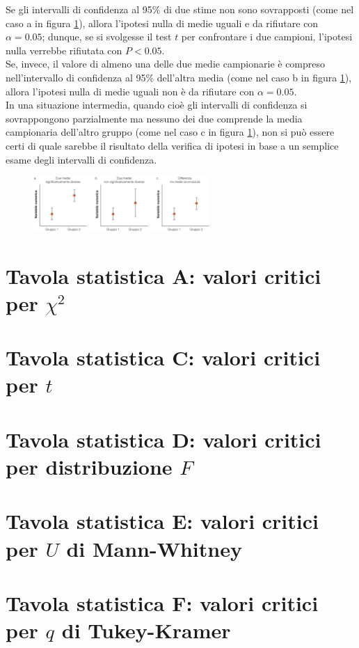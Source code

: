 \documentclass[10pt, draft]{book}
\begin{document}
Se gli intervalli di confidenza al 95\% di due stime non sono sovrapposti (come nel caso a in figura \ref{fig12.6-1}), allora l'ipotesi nulla di medie uguali e da rifiutare con $\alpha = 0.05$; dunque, se si svolgesse il test $t$ per confrontare i due campioni, l'ipotesi nulla verrebbe rifiutata con $P < 0.05$.
\\
Se, invece, il valore di almeno una delle due medie campionarie è compreso nell'intervallo di confidenza al 95\% dell'altra media (come nel caso b in figura \ref{fig12.6-1}), allora l'ipotesi nulla di medie uguali non è da rifiutare con $\alpha = 0.05$.
\\
In una situazione intermedia, quando cioè gli intervalli di confidenza si sovrappongono parzialmente ma nessuno dei due comprende la media campionaria dell'altro gruppo (come nel caso c in figura \ref{fig12.6-1}), non si può essere certi di quale sarebbe il risultato della verifica di ipotesi in base a un semplice esame degli intervalli di confidenza.
\begin{figure}[H]\label{fig12.6-1}
    \centering
    \includegraphics[width=0.6\textwidth]{fig12.6-1}
    \caption{\small{}}
\end{figure}


\section{Tavola statistica A: valori critici per \texorpdfstring{$\chi^2$}{Lg}} \label{tavA}

\section{Tavola statistica C: valori critici per \texorpdfstring{$t$}{Lg}} \label{tavC}

\section{Tavola statistica D: valori critici per distribuzione \texorpdfstring{$F$}{Lg}} \label{tavD}

\section{Tavola statistica E: valori critici per \texorpdfstring{$U$}{Lg} di Mann-Whitney} \label{tavE}

\section{Tavola statistica F: valori critici per \texorpdfstring{$q$}{Lg} di Tukey-Kramer} \label{tavF}
\end{document}
